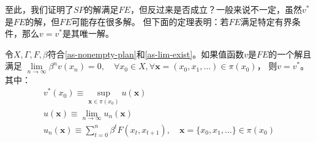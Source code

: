 至此，我们证明了$SP$的解满足$FE$，但反过来是否成立？一般来说不一定，虽然$v^*$是$FE$的解，但$FE$可能存在很多解。
但下面的定理表明：若$FE$满足特定有界条件，那么$v=v^*$是其唯一解。

\begin{theorem} \label{th-solution-fe-sp}
    令$X, \Gamma, F, \beta$符合\cref{as-nonempty-plan}和\cref{as-lim-exist}。如果值函数$v$是$FE$的一个解且满足
    $\lim\limits_{n\rightarrow \infty}\beta^n v\left(x_n\right)=0, 
    \quad \forall x_0\in X, \forall \boldsymbol{x}=\left(x_0,x_1,\dots\right)\in \pi\left(x_0\right)$，
    则$v=v^*$。其中：
    \begin{gather*}
        v^*\left(x_0\right) \equiv \sup _{\boldsymbol{x}\in\pi\left(x_0\right)} u\left(\boldsymbol{x}\right) \\
        u\left(\boldsymbol{x}\right) \equiv \lim _{n\rightarrow\infty}u_n\left(\boldsymbol{x}\right) \\
        u_n(\boldsymbol{x}) \equiv \sum_{t=0}^n \beta^t F\left(x_t, x_{t+1}\right), 
            \quad \boldsymbol{x}=\{x_0,x_1,\dots\} \in \pi\left(x_0\right)
    \end{gather*}
\end{theorem}
